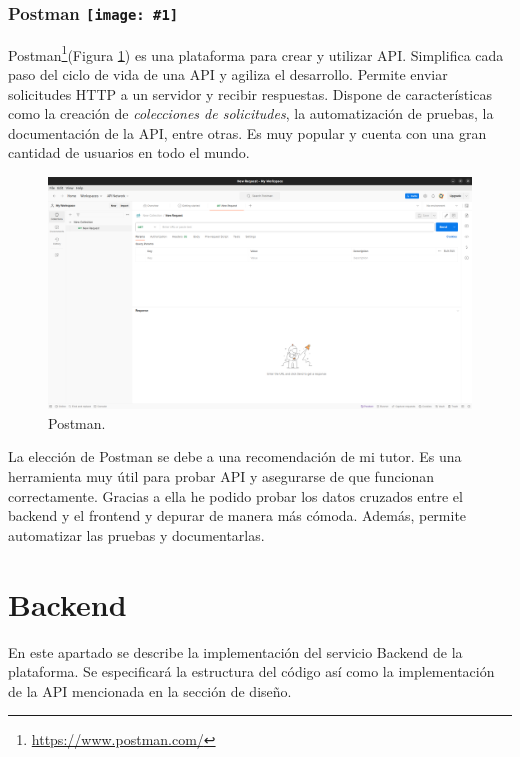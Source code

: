 \renewcommand{\icon}[1]{\texttt{[image: \#1]}}
\subsubsection*{Postman \protect\icon{./imagenes/postman_logo.png}}

Postman\footnote{\url{https://www.postman.com/}}(Figura \ref{fig:postman}) es una plataforma para crear y utilizar API. Simplifica cada paso del ciclo de vida de una API y agiliza el desarrollo. Permite enviar solicitudes HTTP a un servidor y recibir respuestas. Dispone de características como la creación de \textit{colecciones de solicitudes}, la automatización de pruebas, la documentación de la API, entre otras. Es muy popular y cuenta con una gran cantidad de usuarios en todo el mundo.\newline

\begin{figure}[H]
    \centering
    \includegraphics[width=1\textwidth]{./imagenes/postman.png}
    \caption{Postman.}
    \label{fig:postman}
\end{figure}

La elección de Postman se debe a una recomendación de mi tutor. Es una herramienta muy útil para probar API y asegurarse de que funcionan correctamente. Gracias a ella he podido probar los datos cruzados entre el backend y el frontend y depurar de manera más cómoda. Además, permite automatizar las pruebas y documentarlas.\newline

\section{Backend}

En este apartado se describe la implementación del servicio Backend de la plataforma. Se especificará la estructura del código así como la implementación de la API mencionada en la sección de diseño.\newline

